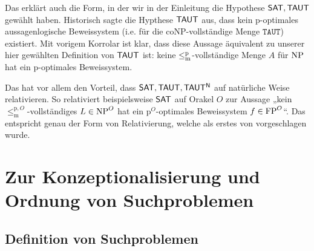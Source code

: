 Das erklärt auch die Form, in der wir in der Einleitung die Hypothese $\mathsf{SAT}, \mathsf{TAUT}$ gewählt haben.
Historisch sagte die Hypthese $\mathsf{TAUT}$ aus, dass kein p-optimales aussagenlogische Beweissystem (i.e. für die coNP-vollständige Menge $\mathtt{TAUT}$) existiert.
Mit vorigem Korrolar ist klar, dass diese Aussage äquivalent zu unserer hier gewählten Definition von $\mathsf{TAUT}$ ist: keine $\leq_\mathrm{m}^\mathrm{p}$-vollständige Menge $A$ für $\mathrm{NP}$ hat ein p-optimales Beweissystem.
%

Das hat vor allem den Vorteil, dass $\mathsf{SAT}, \mathsf{TAUT}, \mathsf{TAUT^N}$ auf natürliche Weise relativieren.
So relativiert beispielsweise $\mathsf{SAT}$ auf Orakel $O$ zur Aussage „kein $\leq_\mathrm{m}^{\mathrm p,O}$-vollständiges $L\in\mathrm{NP}^O$ hat ein p${}^O$-optimales Beweissystem $f\in\mathrm{FP}^O$“.
Das entspricht genau der Form von Relativierung, welche als erstes von \textcite{dose_oracle_2020} vorgeschlagen wurde.


\chapter{Zur Konzeptionalisierung und Ordnung von Suchproblemen}


\section{Definition von Suchproblemen}

